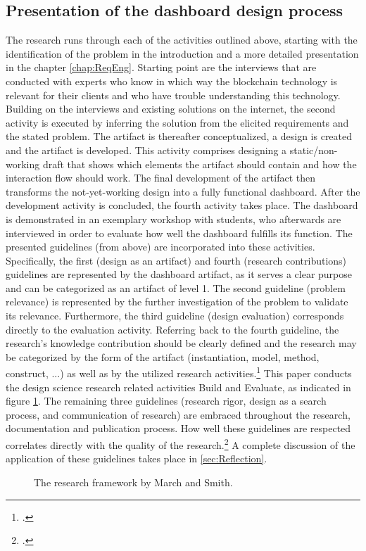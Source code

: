 \subsection{Presentation of the dashboard design process}
The research runs through each of the activities outlined above, starting with the identification of the problem in the introduction and a more detailed presentation in the chapter \ref{chap:ReqEng}. Starting point are the interviews that are conducted with experts who know in which way the blockchain technology is relevant for their clients and who have trouble understanding this technology. Building on the interviews and existing solutions on the internet, the second activity is executed by inferring the solution from the elicited requirements and the stated problem. The artifact is thereafter conceptualized, a design is created and the artifact is developed. This activity comprises designing a static/non-working draft that shows which elements the artifact should contain and how the interaction flow should work. The final development of the artifact then transforms the not-yet-working design into a fully functional dashboard. After the development activity is concluded, the fourth activity takes place. The dashboard is demonstrated in an exemplary workshop with students, who afterwards are interviewed in order to evaluate how well the dashboard fulfills its function. The presented guidelines (from above) are incorporated into these activities. Specifically, the first (design as an artifact) and fourth (research contributions) guidelines are represented by the dashboard artifact, as it serves a clear purpose and can be categorized as an artifact of level 1. The second guideline (problem relevance) is represented by the further investigation of the problem to validate its relevance. Furthermore, the third guideline (design evaluation) corresponds directly to the evaluation activity. Referring back to the fourth guideline, the research's knowledge contribution should be clearly defined and the research may be categorized by the form of the artifact (instantiation, model, method, construct, ...) as well as by the utilized research activities.\footcite[Cf.][p.255]{MarchDesignnaturalscience1995} This paper conducts the design science research related activities Build and Evaluate, as indicated in figure \ref{fig:researchFR}. The remaining three guidelines (research rigor, design as a search process, and communication of research) are embraced throughout the research, documentation and publication process. How well these guidelines are respected correlates directly with the quality of the research.\footcite[Cf.][p.19]{HevnerDesignResearchInformation2010} A complete discussion of the application of these guidelines takes place in \ref{sec:Reflection}.

\begin{figure}
    \centering
    
    \caption[The research framework by March and Smith.]{The research framework by March and Smith.\footnotemark}
    \label{fig:researchFR}
\end{figure}
